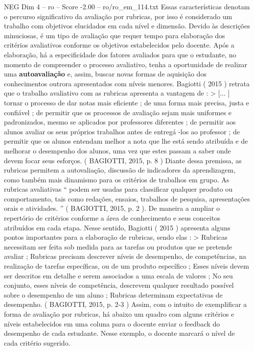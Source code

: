 \begin{textsample}{NEG Dim 4 – ro – Score -2.00 – ro/ro\_em\_114.txt}
Essas características denotam o percurso significativo da avaliação por rubricas, por isso é considerado um trabalho com objetivos elucidados em cada nível e dimensão.
Devido às descrições minuciosas, é um tipo de avaliação que requer tempo para elaboração dos critérios avaliativos conforme os objetivos estabelecidos pelo docente.
Após a elaboração, há a especificidade dos fatores avaliados para que o estudante, no momento de compreender o processo avaliativo, tenha a oportunidade de realizar uma \textbf{autoavaliação} e, assim, buscar novas formas de aquisição dos conhecimentos outrora apresentados com níveis menores.
Bagiotti ( 2015 ) retrata que o trabalho avaliativo com as rubricas apresenta a vantagem de : > [... ] tornar o processo de dar notas mais eficiente ; de uma forma mais precisa, justa e confiável ; de permitir que os processos de avaliação sejam mais uniformes e padronizados, mesmo se aplicados por professores diferentes ; de permitir aos alunos avaliar os seus próprios trabalhos antes de entregá -los ao professor ; de permitir que os alunos entendam melhor a nota que lhe está sendo atribuída e de melhorar o desempenho dos alunos, uma vez que estes passam a saber onde devem focar seus esforços. ( BAGIOTTI, 2015, p. 8 ) Diante dessa premissa, as rubricas permitem a autovaliação, discussão de indicadores da aprendizagem, como também mais dinamismo para os critérios de trabalhos em grupo.
As rubricas avaliativas “ podem ser usadas para classificar qualquer produto ou comportamento, tais como redações, ensaios, trabalhos de pesquisa, apresentações orais e atividades. ” ( BAGIOTTI, 2015, p. 2 ).
De maneira a ampliar o repertório de critérios conforme a área de conhecimento e seus conceitos atribuídos em cada etapa.
Nesse sentido, Bagiotti ( 2015 ) apresenta alguns pontos importantes para a elaboração de rubricas, sendo elas : > Rubricas necessitam ser feita sob medida para as tarefas ou produtos que se pretende avaliar ; Rubricas precisam descrever níveis de desempenho, de competências, na realização de tarefas específicas, ou de um produto específico ; Esses níveis devem ser descritos em detalhe e serem associados a uma escala de valores ; No seu conjunto, esses níveis de competência, descrevem qualquer resultado possível sobre o desempenho de um aluno ; Rubricas determinam expectativas de desempenho. ( BAGIOTTI, 2015, p. 2-3 ) Assim, com o intuito de exemplificar a forma de avaliação por rubricas, há abaixo um quadro com alguns critérios e níveis estabelecidos em uma coluna para o docente enviar o feedback do desempenho de cada estudante.
Nesse exemplo, o docente marcará o nível de cada critério sugerido.

\end{textsample}
